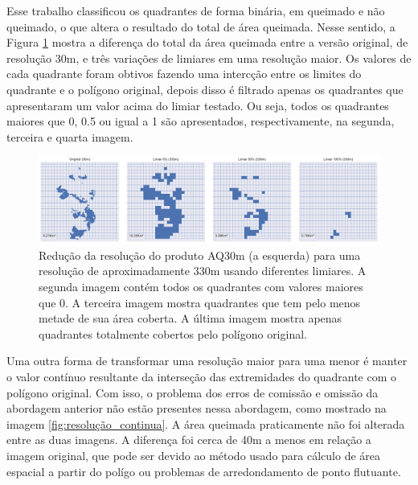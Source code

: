 \documentclass[cic,tc]{iiufrgs}
\begin{document}
Esse trabalho classificou os quadrantes de forma binária, em queimado e não queimado, o que altera o resultado do total de área queimada. Nesse sentido, a Figura \ref{fig:diferenca_resoluções} mostra a diferença do total da área queimada entre a versão original, de resolução 30m, e três variações de limiares em uma resolução maior. Os valores de cada quadrante foram obtivos fazendo uma intercção entre os limites do quadrante e o polígono original, depois disso é filtrado apenas os quadrantes que apresentaram um valor acima do limiar testado. Ou seja, todos os quadrantes maiores que 0, 0.5 ou igual a 1 são apresentados, respectivamente, na segunda, terceira e quarta imagem.

\begin{figure}[H]
    \caption{Redução da resolução do produto AQ30m (a esquerda) para uma resolução de aproximadamente 330m usando diferentes limiares. A segunda imagem contém todos os quadrantes com valores maiores que 0. A terceira imagem mostra quadrantes que tem pelo menos metade de sua área coberta. A última imagem mostra apenas quadrantes totalmente cobertos pelo polígono original.}
    \begin{center}
        \includegraphics[width=35em]{diferenca_resoluções}
    \end{center}
    \label{fig:diferenca_resoluções}
\end{figure}

Uma outra forma de transformar uma resolução maior para uma menor é manter o valor contínuo resultante da interseção das extremidades do quadrante com o polígono original. Com isso, o problema dos erros de comissão e omissão da abordagem anterior não estão presentes nessa abordagem, como mostrado na imagem \ref{fig:resolução_continua}. A área queimada praticamente não foi alterada entre as duas imagens. A diferença foi cerca de 40m a menos em relação a imagem original, que pode ser devido ao método usado para cálculo de área espacial a partir do polígo ou problemas de arredondamento de ponto flutuante.
\end{document}
